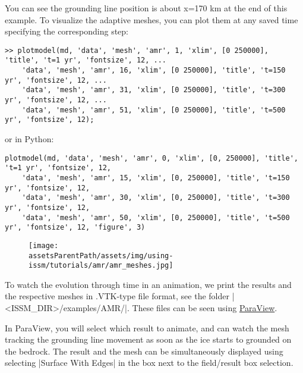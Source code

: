 You can see the grounding line position is about x=170 km at the end of this example. To visualize the adaptive meshes, you can plot them at any saved time specifying the corresponding step:
\begin{lstlisting}
>> plotmodel(md, 'data', 'mesh', 'amr', 1, 'xlim', [0 250000], 'title', 't=1 yr', 'fontsize', 12, ...
	'data', 'mesh', 'amr', 16, 'xlim', [0 250000], 'title', 't=150 yr', 'fontsize', 12, ...
	'data', 'mesh', 'amr', 31, 'xlim', [0 250000], 'title', 't=300 yr', 'fontsize', 12, ...
	'data', 'mesh', 'amr', 51, 'xlim', [0 250000], 'title', 't=500 yr', 'fontsize', 12);
\end{lstlisting}
or in Python:
\begin{lstlisting}
plotmodel(md, 'data', 'mesh', 'amr', 0, 'xlim', [0, 250000], 'title', 't=1 yr', 'fontsize', 12,
	'data', 'mesh', 'amr', 15, 'xlim', [0, 250000], 'title', 't=150 yr', 'fontsize', 12,
	'data', 'mesh', 'amr', 30, 'xlim', [0, 250000], 'title', 't=300 yr', 'fontsize', 12,
	'data', 'mesh', 'amr', 50, 'xlim', [0, 250000], 'title', 't=500 yr', 'fontsize', 12, 'figure', 3)
\end{lstlisting}

\begin{figure}[H]
	\begin{center}
		\texttt{[image: \\assetsParentPath/assets/img/using-issm/tutorials/amr/amr\_meshes.jpg]}
	\end{center}
\end{figure}

To watch the evolution through time in an animation, we print the results and the respective meshes in .VTK-type file format, see the folder \lstinlinebg|<ISSM_DIR>/examples/AMR/|. These files can be seen using \href{https://www.paraview.org/}{ParaView}.

In ParaView, you will select which result to animate, and can watch the mesh tracking the grounding line movement as soon as the ice starts to grounded on the bedrock. The result and the mesh can be simultaneously displayed using selecting \lstinlinebg|Surface With Edges| in the box next to the field/result box selection.

\clearpage %
